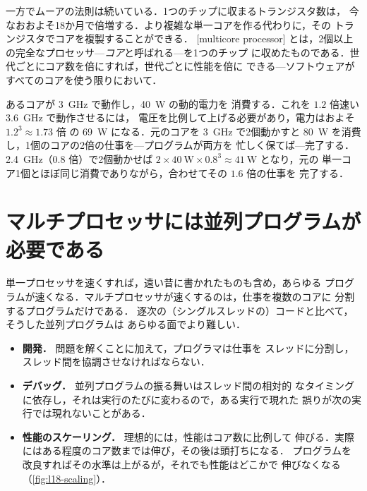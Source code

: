\documentclass[../main.tex]{subfiles}
\begin{document}
一方でムーアの法則は続いている．1つのチップに収まるトランジスタ数は，
今なおおよそ18か月で倍増する．より複雑な単一コアを作る代わりに，その
トランジスタでコアを複製することができる．
[multicore processor]%
とは，2個以上の完全なプロセッサ---\emph{コア}と呼ばれる---を1つのチップ
に収めたものである．世代ごとにコア数を倍にすれば，世代ごとに性能を倍に
できる---ソフトウェアがすべてのコアを使う限りにおいて．

\begin{example}
  \label{ex:l18-power}
  あるコアが \SI{3}{\giga\hertz} で動作し，\SI{40}{\watt} の動的電力を
  消費する．これを $1.2$ 倍速い \SI{3.6}{\giga\hertz} で動作させるには，
  電圧を比例して上げる必要があり，電力はおよそ $1.2^{3}\approx 1.73$ 倍
  の \SI{69}{\watt} になる．元のコアを \SI{3}{\giga\hertz} で2個動かすと
  \SI{80}{\watt} を消費し，1個のコアの2倍の仕事を---プログラムが両方を
  忙しく保てば---完了する．\SI{2.4}{\giga\hertz}（$0.8$ 倍）で2個動かせば
  $2\times\SI{40}{\watt}\times 0.8^{3}\approx\SI{41}{\watt}$ となり，元の
  単一コア1個とほぼ同じ消費でありながら，合わせてその $1.6$ 倍の仕事を
  完了する．
\end{example}

\section{マルチプロセッサには並列プログラムが必要である}
\label{sec:l18-parallel-programs}

単一プロセッサを速くすれば，遠い昔に書かれたものも含め，あらゆる
プログラムが速くなる．マルチプロセッサが速くするのは，仕事を複数のコアに
分割するプログラムだけである．%
逐次の（シングルスレッドの）コードと比べて，そうした並列プログラムは
あらゆる面でより難しい．
\begin{itemize}
  \item \textbf{開発．} 問題を解くことに加えて，プログラマは仕事を
    スレッドに分割し，スレッド間を協調させなければならない．
  \item \textbf{デバッグ．} 並列プログラムの振る舞いはスレッド間の相対的
    なタイミングに依存し，それは実行のたびに変わるので，ある実行で現れた
    誤りが次の実行では現れないことがある．
  \item \textbf{性能のスケーリング．} 理想的には，性能はコア数に比例して
    伸びる．実際にはある程度のコア数までは伸び，その後は頭打ちになる．
    プログラムを改良すればその水準は上がるが，それでも性能はどこかで
    伸びなくなる（\cref{fig:l18-scaling}）．
\end{itemize}
\end{document}
